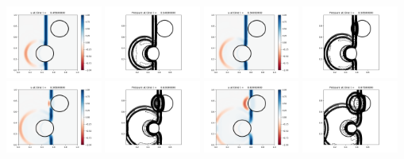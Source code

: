 \documentclass[11pt]{article}
\begin{document}
\includegraphics[width=0.2375\textwidth]{frame0011fig1.png}
\vskip 10pt 
\includegraphics[width=0.2375\textwidth]{frame0012fig0.png}
\includegraphics[width=0.2375\textwidth]{frame0012fig1.png}
\includegraphics[width=0.2375\textwidth]{frame0013fig0.png}
\includegraphics[width=0.2375\textwidth]{frame0013fig1.png}
\vskip 10pt 
\includegraphics[width=0.2375\textwidth]{frame0014fig0.png}
\includegraphics[width=0.2375\textwidth]{frame0014fig1.png}
\includegraphics[width=0.2375\textwidth]{frame0015fig0.png}
\end{document}
